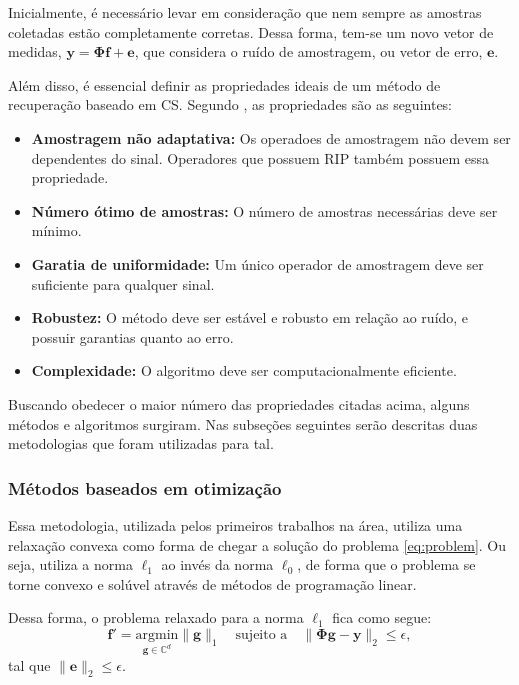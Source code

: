 \documentclass[cic,tc]{iiufrgs}
\renewcommand{\vec}[1]{\bm{#1}}
\begin{document}
Inicialmente, é necessário levar em consideração que nem sempre as amostras coletadas estão completamente corretas.
Dessa forma, tem-se um novo vetor de medidas, $\vec{y} = \mathbf{\Phi} \vec{f} + \vec{e}$, que considera o ruído de amostragem, 
ou vetor de erro, $\vec{e}$.

Além disso, é essencial definir as propriedades ideais de um método de recuperação
baseado em CS. Segundo \citet{chen2015compressed}, as propriedades são as seguintes:
\begin{itemize}
    \item \textbf{Amostragem não adaptativa:} Os operadoes de amostragem não devem ser dependentes do sinal. 
          Operadores que possuem RIP também possuem essa propriedade.
    \item \textbf{Número ótimo de amostras:} O número de amostras necessárias deve ser mínimo.
    \item \textbf{Garatia de uniformidade:} Um único operador de amostragem deve ser suficiente para qualquer sinal.
    \item \textbf{Robustez:} O método deve ser estável e robusto em relação ao ruído, e possuir garantias 
          quanto ao erro.
    \item \textbf{Complexidade:} O algoritmo deve ser computacionalmente eficiente.
\end{itemize}

Buscando obedecer o maior número das propriedades citadas acima, alguns métodos e algoritmos surgiram. 
Nas subseções seguintes serão descritas duas metodologias que foram utilizadas para tal.

\subsubsection{Métodos baseados em otimização}
Essa metodologia, utilizada pelos primeiros trabalhos na área, utiliza uma relaxação convexa como forma
de chegar a solução do problema \eqref{eq:problem}. 
Ou seja, utiliza a norma $\ell_1$ ao invés da norma $\ell_0$,
de forma que o problema se torne convexo e solúvel através de métodos de programação linear.

Dessa forma, o problema relaxado para a norma $\ell_1$ fica como segue:
\begin{equation}
    \label{eq:probleml1}
    \vec{f'} = \underset{\vec{g} \in \mathbb{C}^d}{\text{argmin}} \lVert \vec{g} \rVert_1 \hspace{1em} \text{sujeito a} \hspace{1em}
    \lVert \mathbf{\Phi} \vec{g} - \vec{y} \rVert_2 \le \epsilon,
\end{equation}
tal que $\lVert \vec{e} \rVert_2 \le \epsilon $.
\end{document}
